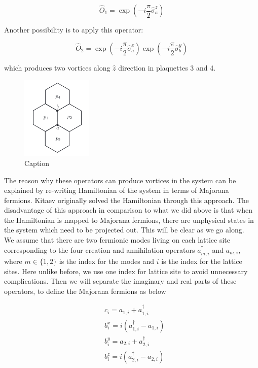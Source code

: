\documentclass{article}
\begin{document}
\begin{equation}\label{eq:18}
    \hat{O}_1 = \exp{(-i\frac{\pi}{2}\hat{\sigma}^{z}_a)}
\end{equation}{}

Another possibility is to apply this operator: 

\begin{equation}\label{eq:19}
    \hat{O}_2 = \exp{(-i\frac{\pi}{2}\hat{\sigma}^{x}_a)}\exp{(-i\frac{\pi}{2}\hat{\sigma}^{y}_b)}
\end{equation}{}

which produces two vortices along $\hat{z}$ direction in plaquettes 3 and 4.

\begin{figure}[!htb]
    \centering
    \includegraphics[width=0.3\textwidth]{./images/anyons.png}
    \caption{Caption}
    \label{fig:anyons}
\end{figure}{}

The reason why these operators can produce vortices in the system can be explained by re-writing Hamiltonian of the system in terms of Majorana fermions. Kitaev originally solved the Hamiltonian through this approach. The disadvantage of this approach in comparison to what we did above is that when the Hamiltonian is mapped to Majorana fermions, there are unphysical states in the system which need to be projected out. This will be clear as we go along.\\

We assume that there are two fermionic modes living on each lattice site corresponding to the four creation and annihilation operators $a^\dagger_{m,i}$ and $a_{m,i}$, where $m\in \{1,2\}$ is the index for the modes and $i$ is the index for the lattice sites. Here unlike before, we use one index for lattice site to avoid unnecessary complications. Then we will separate the imaginary and real parts of these operators, to define the Majorana fermions as below

\begin{equation}\label{eq:20}
    \begin{aligned}
        & c_i = a_{1,i} + a^\dagger_{1,i} \\
        & b^x_i = i(a^\dagger_{1,i} - a_{1,i}) \\
        & b^y_i = a_{2,i} + a^\dagger_{2,i} \\
        & b^z_i = i(a^\dagger_{2,i} - a_{2,i})
    \end{aligned}
\end{equation}{}\\
\end{document}
